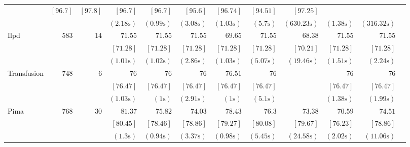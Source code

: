 \begin{table*}[h]
\begin{center}
\begin{tabular}{l  r  r r r r r r r rrr}
			& $  [ 96.7 ] $    & $  [ 97.8 ] $    & $  [ 96.7 ] $    & $  [ 96.7 ] $    & $  [ 95.6 ] $    & $  [ 96.74 ] $    & $  [ 94.51 ] $    & $  [ 97.25 ] $   \\ & & 
			& $  ( 2.18 \text{s} ) $    & $  ( 0.99 \text{s} ) $    & $  ( 3.08 \text{s} ) $    & $  ( 1.03 \text{s} ) $    & $  ( 5.7 \text{s} ) $    & $  ( 630.23 \text{s} ) $    & $  ( 1.38 \text{s} ) $    & $  ( 316.32 \text{s} ) $   \\[.1cm] 
			{ Ilpd}   & $  583 $  & $  14 $  & $   71.55  $    & $   71.55  $    & $   71.55  $    & $   69.65  $    & $   71.55  $    & $   68.38  $    & $   71.55  $    & $   71.55  $   \\ & & 
			& $  [ 71.28 ] $    & $  [ 71.28 ] $    & $  [ 71.28 ] $    & $  [ 71.28 ] $    & $  [ 71.28 ] $    & $  [ 70.21 ] $    & $  [ 71.28 ] $    & $  [ 71.28 ] $   \\ & & 
			& $  ( 1.01 \text{s} ) $    & $  ( 1.02 \text{s} ) $    & $  ( 2.86 \text{s} ) $    & $  ( 1.03 \text{s} ) $    & $  ( 5.07 \text{s} ) $    & $  ( 19.46 \text{s} ) $    & $  ( 1.51 \text{s} ) $    & $  ( 2.24 \text{s} ) $   \\[.1cm] 
			{ Transfusion}   & $  748 $  & $  6 $  & $   76 $    & $   76 $    & $   76 $    & $   76.51  $    & $   76 $    &   \multicolumn{1}{c}{\multirow{3}{*}{\textemdash}}       & $   76 $    & $   76 $   \\ & & 
			& $  [ 76.47 ] $    & $  [ 76.47 ] $    & $  [ 76.47 ] $    & $  [ 76.47 ] $    & $  [ 76.47 ] $    &       & $  [ 76.47 ] $    & $  [ 76.47 ] $   \\ & & 
			& $  ( 1.03 \text{s} ) $    & $  ( 1\text{s} ) $    & $  ( 2.91 \text{s} ) $    & $  ( 1\text{s} ) $    & $  ( 5.1 \text{s} ) $    &       & $  ( 1.38 \text{s} ) $    & $  ( 1.99 \text{s} ) $   \\[.1cm] 
			{ Pima}   & $  768 $  & $  30 $  & $   81.37  $    & $   75.82  $    & $   74.03  $    & $   78.43  $    & $   76.3  $    & $   73.38  $    & $   70.59  $    & $   74.51  $   \\ & & 
			& $  [ 80.45 ] $    & $  [ 78.46 ] $    & $  [ 78.86 ] $    & $  [ 79.27 ] $    & $  [ 80.08 ] $    & $  [ 79.67 ] $    & $  [ 76.23 ] $    & $  [ 78.86 ] $   \\ & & 
			& $  ( 1.3 \text{s} ) $    & $  ( 0.94 \text{s} ) $    & $  ( 3.37 \text{s} ) $    & $  ( 0.98 \text{s} ) $    & $  ( 5.45 \text{s} ) $    & $  ( 24.58 \text{s} ) $    & $  ( 2.02 \text{s} ) $    & $  ( 11.06 \text{s} ) $   \\[.1cm] 

\end{tabular}
\end{center}
\end{table*}
